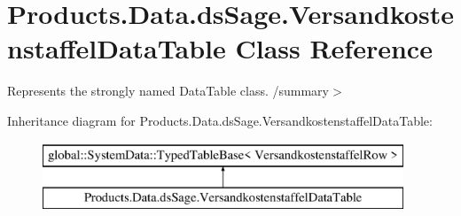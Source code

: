 \hypertarget{class_products_1_1_data_1_1ds_sage_1_1_versandkostenstaffel_data_table}{}\section{Products.\+Data.\+ds\+Sage.\+Versandkostenstaffel\+Data\+Table Class Reference}
\label{class_products_1_1_data_1_1ds_sage_1_1_versandkostenstaffel_data_table}


Represents the strongly named Data\+Table class. /summary$>$  


Inheritance diagram for Products.\+Data.\+ds\+Sage.\+Versandkostenstaffel\+Data\+Table\+:\begin{figure}[H]
\begin{center}
\leavevmode
\includegraphics[height=2.000000cm]{class_products_1_1_data_1_1ds_sage_1_1_versandkostenstaffel_data_table}
\end{center}
\end{figure}
